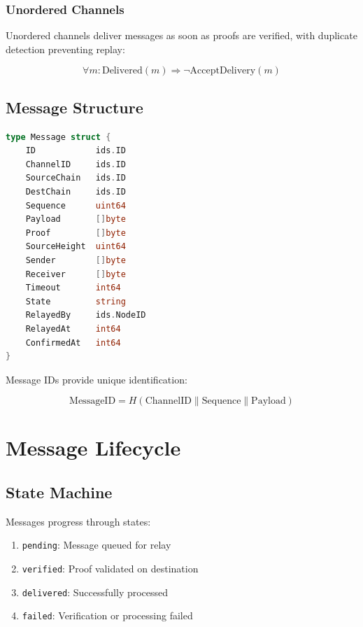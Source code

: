 \documentclass[11pt,twocolumn]{article}
\begin{document}
\subsubsection{Unordered Channels}

Unordered channels deliver messages as soon as proofs are verified, with duplicate detection preventing replay:

\begin{equation}
\forall m : \text{Delivered}(m) \Rightarrow \neg \text{AcceptDelivery}(m)
\end{equation}

\subsection{Message Structure}

\begin{lstlisting}[language=Go,basicstyle=\ttfamily\small]
type Message struct {
    ID            ids.ID
    ChannelID     ids.ID
    SourceChain   ids.ID
    DestChain     ids.ID
    Sequence      uint64
    Payload       []byte
    Proof         []byte
    SourceHeight  uint64
    Sender        []byte
    Receiver      []byte
    Timeout       int64
    State         string
    RelayedBy     ids.NodeID
    RelayedAt     int64
    ConfirmedAt   int64
}
\end{lstlisting}

Message IDs provide unique identification:

\begin{equation}
\text{MessageID} = H(\text{ChannelID} \| \text{Sequence} \| \text{Payload})
\end{equation}

\section{Message Lifecycle}

\subsection{State Machine}

Messages progress through states:

\begin{enumerate}
\item \texttt{pending}: Message queued for relay
\item \texttt{verified}: Proof validated on destination
\item \texttt{delivered}: Successfully processed
\item \texttt{failed}: Verification or processing failed
\end{enumerate}
\end{document}
